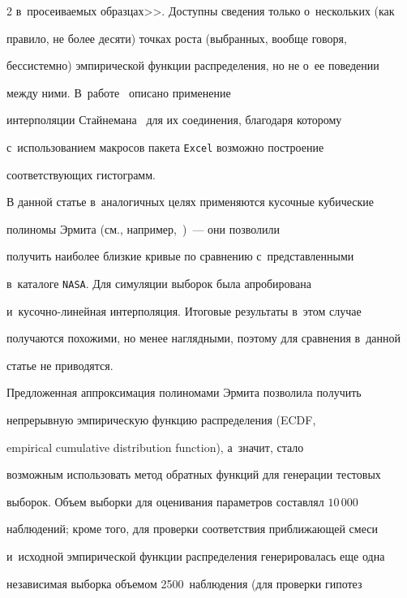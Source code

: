 \begin{multicols}{2}
в~про\-сеи\-ва\-емых образцах>>. Доступны сведения только о~нескольких (как 


правило, не более десяти) точках роста (выбранных, вообще говоря, 


бессистемно) эмпирической функции распределения, но не о~ее поведении 


между ними. В~работе~\cite{Graf1993} описано применение 


интерполяции Стайнемана~\cite{Stineman1980} для их соединения, благодаря которому


с~использованием макросов пакета \verb"Excel" возможно построение


 соответствующих  гистограмм.





В данной статье в~аналогичных целях применяются кусочные кубические 


полиномы Эрмита (см., например,~\cite{Fritsch1980})~--- они позволили 


получить наиболее близкие кривые по сравнению с~пред\-став\-лен\-ны\-ми 


в~каталоге \verb"NASA". Для симуляции выборок была апробирована 


и~кусочно-линейная интерполяция. Итоговые результаты в~этом случае 


получаются похожими, но менее наглядными, поэтому для сравнения в~данной 


статье не при\-во\-дятся.


{ %





}





Предложенная аппроксимация полиномами Эрмита позволила получить 


непрерывную эмпирическую функцию распределения (ECDF,


empirical cumulative distribution function), а~значит, стало 


возможным использовать метод обратных функций для генерации тестовых 


выборок. Объем выборки для оценивания параметров составлял $10\,000$ 


наблюдений; кроме того, для проверки соответствия приближающей смеси 


и~исходной эмпирической функции распределения генерировалась еще одна 


независимая выборка объемом 2500~наблюдения (для проверки гипотез 



\end{multicols}
